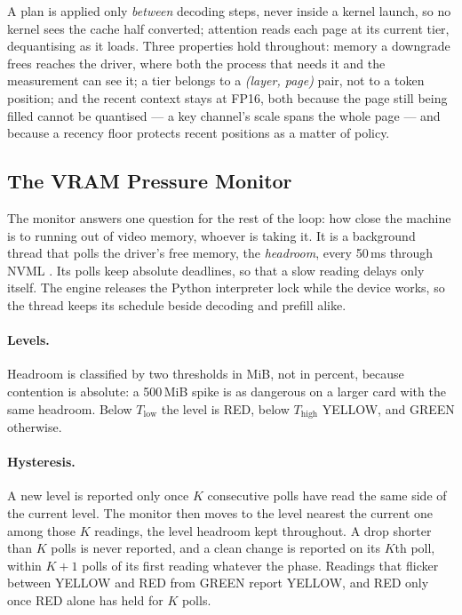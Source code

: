 \documentclass[11pt]{article}
\begin{document}
A plan is applied only \textit{between} decoding steps, never inside a kernel
launch, so no kernel sees the cache half converted; attention reads each page at
its current tier, dequantising as it loads. Three properties hold throughout:
memory a downgrade frees reaches the driver, where both the process that needs it
and the measurement can see it; a tier belongs to a \textit{(layer, page)} pair,
not to a token position; and the recent context stays at FP16, both because the
page still being filled cannot be quantised --- a key channel's scale spans the
whole page --- and because a recency floor protects recent positions as a matter
of policy.

\subsection{The VRAM Pressure Monitor}
\label{sec:monitor}

The monitor answers one question for the rest of the loop: how close the machine
is to running out of video memory, whoever is taking it. It is a background
thread that polls the driver's free memory, the \textit{headroom}, every 50\,ms
through NVML \cite{nvml}. Its polls keep absolute deadlines, so that a slow reading delays
only itself. The engine releases the Python interpreter lock while the device
works, so the thread keeps its schedule beside decoding and prefill alike.

\paragraph{Levels.} Headroom is classified by two thresholds in MiB, not in
percent, because contention is absolute: a 500\,MiB spike is as dangerous on a
larger card with the same headroom. Below $T_\mathrm{low}$ the level is RED,
below $T_\mathrm{high}$ YELLOW, and GREEN otherwise.

\paragraph{Hysteresis.} A new level is reported only once $K$ consecutive polls
have read the same side of the current level. The monitor then moves to the
level nearest the current one among those $K$ readings, the level headroom kept
throughout. A drop shorter than $K$ polls is never reported, and a clean change
is reported on its $K$th poll, within $K+1$ polls of its first reading
whatever the phase. Readings that flicker between YELLOW and RED from GREEN
report YELLOW, and RED only once RED alone has held for $K$ polls.
\end{document}
